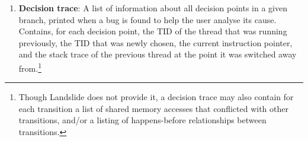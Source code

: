 \begin{enumerate}
	\item {\bf Decision trace}:
		A list of information about all decision points in a given branch, printed when a bug is found to help the user analyse its cause. Contains, for each decision point, the TID of the thread that was running previously, the TID that was newly chosen, the current instruction pointer, and the stack trace of the previous thread at the point it was switched away from.\footnote{Though Landslide does not provide it, a decision trace may also contain for each transition a list of shared memory accesses that conflicted with other transitions, and/or a listing of happens-before relationships between transitions.}
\end{enumerate}


